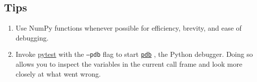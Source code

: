\documentclass{article}
\numberwithin{equation}{section}
\newcommand{\pytest}{\href{https://docs.pytest.org/en/stable/}{pytest}}
\newcommand{\pdb}{%
    \href{https://docs.python.org/3/library/pdb.html}{\texttt{pdb}}%
}
\begin{document}
\subsection{Tips}

\begin{enumerate}
    \item
    Use NumPy functions whenever possible for efficiency, brevity, and ease
    of debugging.

    \item
    Invoke \pytest{} with the \texttt{--pdb} flag to start \pdb, the Python
    debugger. Doing so allows you to inspect the variables in the current call
    frame and look more closely at what went wrong.
\end{enumerate}
\end{document}
